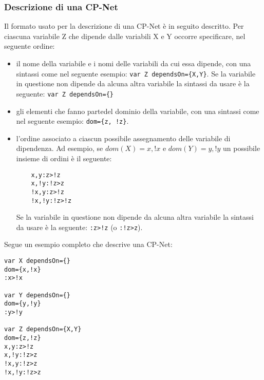 \subsubsection{Descrizione di una CP-Net}
\label{sect:file}
Il formato usato per la descrizione di una CP-Net è in seguito descritto.
Per ciascuna variabile Z che dipende dalle variabili X e Y occorre specificare,
nel seguente ordine:
\begin{itemize}
  \item il nome della variabile e i nomi delle variabili da cui essa dipende, con
  una sintassi come nel seguente esempio: \texttt{var Z dependsOn=\{X,Y\}}. Se la
  variabile in questione non dipende da alcuna altra variabile la sintassi da
  usare è la seguente: \texttt{var Z dependsOn=\{\}}
  \item gli elementi che fanno partedel dominio della variabile, con una sintassi
  come nel seguente esempio: \texttt{dom=\{z, !z\}}.
  \item l'ordine associato a ciascun possibile assegnamento delle variabile di
  dipendenza. Ad esempio, se $dom(X)={x,!x}$ e $dom(Y)={y,!y}$ un possibile
  insieme di ordini è il seguente:
  \begin{verbatim}
    x,y:z>!z
    x,!y:!z>z
    !x,y:z>!z
    !x,!y:!z>!z
  \end{verbatim}
  Se la variabile in questione non dipende da alcuna altra variabile la sintassi
  da usare è la seguente: \texttt{:z>!z} (o \texttt{:!z>z}).
\end{itemize} 

Segue un esempio completo che descrive una CP-Net:
\begin{verbatim}
var X dependsOn={}
dom={x,!x}
:x>!x

var Y dependsOn={}
dom={y,!y}
:y>!y

var Z dependsOn={X,Y}
dom={z,!z}
x,y:z>!z
x,!y:!z>z
!x,y:!z>z
!x,!y:!z>z
\end{verbatim}